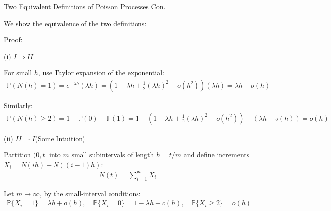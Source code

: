 \documentclass{beamer}
\begin{document}
\begin{frame}{Two Equivalent Definitions of Poisson Processes Con.}

     {\footnotesize \scriptsize
    \par We show the equivalence of the two definitions:
    \par Proof:
    \par (i) $I \Rightarrow II$
    \par For small $h$, use Taylor expansion of the exponential:
    \begin{align*}
         \mathbb{P}(N(h) = 1) = e^{-\lambda h}(\lambda h) = (1 - \lambda h + \frac{1}{2}(\lambda h)^2 + o(h^2))(\lambda h) = \lambda h + o(h)
    \end{align*}
    \par Similarly:
    \begin{align*}
        \mathbb{P}(N(h) \geq 2) = 
        1 - \mathbb{P}(0) - \mathbb{P}(1) = 1 - \left(1 - \lambda h 
        + \frac{1}{2}(\lambda h)^2 + o(h^2)\right) - \left(\lambda h + o(h)\right) = o(h)
    \end{align*}\pause
    \par (ii) $II \Rightarrow I$(Some Intuition)
    \par Partition $(0, t]$ into $m$ small subintervals of length $h = t/m$ and define increments $X_i = N(ih) - N((i - 1)h)$:
    \begin{align*}
        N(t) = \sum_{i=1}^m X_i
    \end{align*}
    \par Let $m \rightarrow \infty$, by the small-interval conditions:
    \begin{align*}
        \mathbb{P}\{X_i = 1\} = \lambda h + o(h), \quad \mathbb{P}\{X_i = 0\} = 1 - \lambda h + o(h), \quad \mathbb{P}\{X_i \geq 2\} = o(h)
    \end{align*}
     }
\end{frame}
\end{document}

